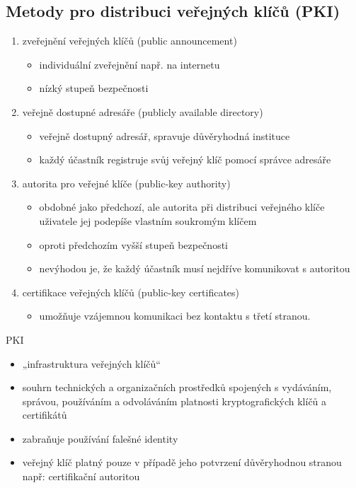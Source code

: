 \subsection{Metody pro distribuci veřejných klíčů (PKI)}
\begin{enumerate}
    \item zveřejnění veřejných klíčů (public announcement)
    \begin{itemize}
    \item individuální zveřejnění např. na internetu
    \item nízký stupeň bezpečnosti
    \end{itemize}
\item veřejně dostupné adresáře (publicly available directory)
    \begin{itemize}
    \item veřejně dostupný adresář, spravuje důvěryhodná instituce
    \item každý účastník registruje svůj veřejný klíč pomocí správce adresáře
    \end{itemize}
\item autorita pro veřejné klíče (public-key authority)
    \begin{itemize}
    \item obdobné jako předchozí, ale autorita při distribuci veřejného klíče uživatele jej podepíše vlastním soukromým klíčem
    \item oproti předchozím vyšší stupeň bezpečnosti
    \item nevýhodou je, že každý účastník musí nejdříve komunikovat s autoritou
    \end{itemize}
\item certifikace veřejných klíčů (public-key certificates)
    \begin{itemize}
    \item umožňuje vzájemnou komunikaci bez kontaktu s třetí stranou.
    \end{itemize}
\end{enumerate}

PKI
\begin{itemize}
    \item „infrastruktura veřejných klíčů“
    \item souhrn technických a organizačních prostředků spojených s vydáváním, správou, používáním a odvoláváním platnosti kryptografických klíčů a certifikátů
    \item zabraňuje používání falešné identity
    \item veřejný klíč platný pouze v případě jeho potvrzení důvěryhodnou stranou např: certifikační autoritou
\end{itemize}



